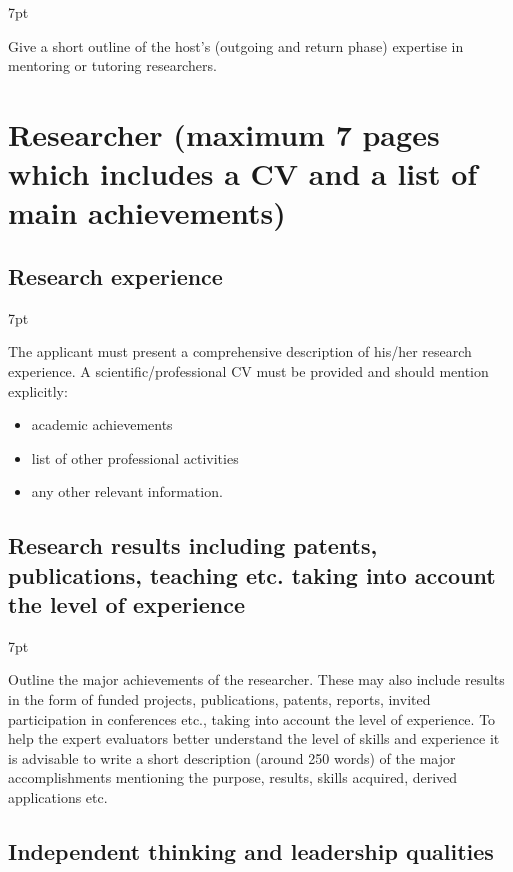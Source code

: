 \documentclass[11pt]{ltxdoc}
\newenvironment{formal}{%
  \def\FrameCommand{%
    \hspace{1pt}%
    {\color{darkblue}\vrule width 2pt}%
    {\color{formalshade}\vrule width 4pt}%
    \colorbox{formalshade}%
  }%
  \MakeFramed{\advance\hsize-\width\FrameRestore}%
  \noindent\hspace{-4.55pt}%
  \begin{adjustwidth}{}{7pt}%
  \vspace{2pt}\vspace{2pt}%
}
{%
  \vspace{2pt}\end{adjustwidth}\endMakeFramed%
}
\begin{document}
\begin{formal}
  Give a short outline of the host's (outgoing and return phase)
  expertise in mentoring or tutoring researchers.
\end{formal}


\section{Researcher (maximum 7 pages which includes a CV and a list of
  main achievements)}

\subsection{Research experience}

\begin{formal}
The applicant must present a comprehensive description of his/her research experience. A 
scientific/professional CV must be provided and should mention explicitly: 
\begin{itemize}
\item academic achievements 
\item list of other professional activities 
\item any other relevant information. 
\end{itemize}
\end{formal}

\subsection{Research results including patents, publications, teaching
  etc. taking into account the level of experience}

\begin{formal}
  Outline the major achievements of the researcher. These may also
  include results in the form of funded projects, publications,
  patents, reports, invited participation in conferences etc., taking
  into account the level of experience. To help the expert evaluators
  better understand the level of skills and experience it is advisable
  to write a short description (around 250 words) of the major
  accomplishments mentioning the purpose, results, skills acquired,
  derived applications etc.
\end{formal}

\subsection{Independent thinking and leadership qualities}
\end{document}
